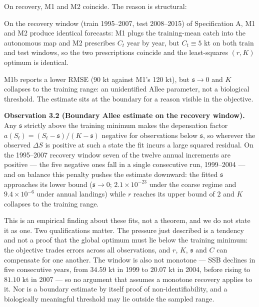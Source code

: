 \documentclass[11pt]{article}
\begin{document}
On recovery, M1 and M2 coincide. The reason is structural:

On the recovery window (train 1995--2007, test 2008--2015) of
Specification A, M1 and M2 produce identical forecasts: M1 plugs the
training-mean catch into the autonomous map and M2 prescribes \(C_t\)
year by year, but \(C_t\equiv 5\) kt on both train and test windows, so
the two prescriptions coincide and the least-squares \((r,K)\) optimum is
identical.

M1b reports a lower RMSE (90 kt against M1's 120 kt), but
\(\mathfrak s\to 0\) and \(K\) collapses to the training range: an
unidentified Allee parameter, not a biological threshold. The estimate
sits at the boundary for a reason visible in the objective.

\textbf{Observation 3.2 (Boundary Allee estimate on the recovery
window).} Any \(\mathfrak s\) strictly above the training minimum makes
the depensation factor
\(a(S_t)=(S_t-\mathfrak s)/(K-\mathfrak s)\) negative for observations
below \(\mathfrak s\), so wherever the observed \(\Delta S\) is positive
at such a state the fit incurs a large squared residual. On the
1995--2007 recovery window seven of the twelve annual increments are
positive --- the five negative ones fall in a single consecutive run,
1999--2004 --- and on balance this penalty pushes the estimate downward: the fitted \(\mathfrak s\)
approaches its lower bound (\(\mathfrak s \to 0\); \(2.1\times10^{-23}\)
under the coarse regime and \(9.4\times10^{-6}\) under annual landings)
while \(r\) reaches its upper bound of \(2\) and \(K\) collapses to the
training range.

This is an empirical finding about these fits, not a theorem, and we do
not state it as one. Two qualifications matter. The pressure just
described is a tendency and not a proof that the global optimum must lie
below the training minimum: the objective trades errors across all
observations, and \(r\), \(K\), \(\mathfrak s\) and \(C\) can compensate
for one another. The window is also not monotone --- SSB declines in
five consecutive years, from \(34.59\) kt in 1999 to \(20.07\) kt in
2004, before rising to \(81.10\) kt in 2007 --- so no argument that
assumes a monotone recovery applies to it. Nor is a boundary estimate by
itself proof of non-identifiability, and a biologically meaningful
threshold may lie outside the sampled range.
\end{document}
